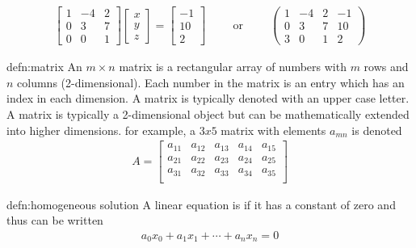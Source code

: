 \begin{align}
\begin{bmatrix}
1 & -4 & 2 \\
0 & 3 & 7 \\
0 & 0 & 1
\end{bmatrix}
\begin{bmatrix}
x \\
y \\
z
\end{bmatrix}
=
\begin{bmatrix}
-1 \\
10 \\
2
\end{bmatrix} 
\hspace{1cm} \text{or} \hspace{1cm} 
\left(
\begin{array}{ccc|c}
1 & -4 & 2 & -1 \\
0 & 3 & 7 & 10\\
3 & 0 & 1 & 2
\end{array}
\right)
\end{align}



\begin{defn}[Matrix]{defn:matrix}
	An $m\times n$ matrix is a rectangular array of numbers with $m$ rows and $n$ columns (2-dimensional). Each number in the matrix is an entry which has an index in each dimension. A matrix is typically denoted with an upper case letter. A matrix is typically a 2-dimensional object but can be mathematically extended into higher dimensions. for example, a $3x5$ matrix with elements $a_{mn}$ is denoted
	\begin{align*}
	A = 
	\begin{bmatrix}
	a_{11} & a_{12} & a_{13} & a_{14} & a_{15} \\
	a_{21} & a_{22} & a_{23} & a_{24} & a_{25} \\
	a_{31} & a_{32} & a_{33} & a_{34} & a_{35} \\
	\end{bmatrix}
	\end{align*}
\end{defn}

\begin{defn}{defn:homogeneous solution}
	A linear equation is  if it has a constant of zero and thus can be written
	\begin{align}
	a_0x_0+a_1x_1+\cdots+a_nx_n=0
	\end{align}
\end{defn}


